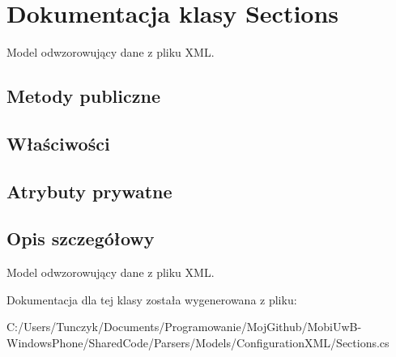 \hypertarget{a00054}{}\section{Dokumentacja klasy Sections}
\label{a00054}


Model odwzorowujący dane z pliku X\+M\+L.  


\subsection*{Metody publiczne}
\subsection*{Właściwości}
\subsection*{Atrybuty prywatne}


\subsection{Opis szczegółowy}
Model odwzorowujący dane z pliku X\+M\+L. 



Dokumentacja dla tej klasy została wygenerowana z pliku\+:\begin{DoxyCompactItemize}
\item 
C\+:/\+Users/\+Tunczyk/\+Documents/\+Programowanie/\+Moj\+Github/\+Mobi\+Uw\+B-\/\+Windows\+Phone/\+Shared\+Code/\+Parsers/\+Models/\+Configuration\+X\+M\+L/Sections.\+cs\end{DoxyCompactItemize}
